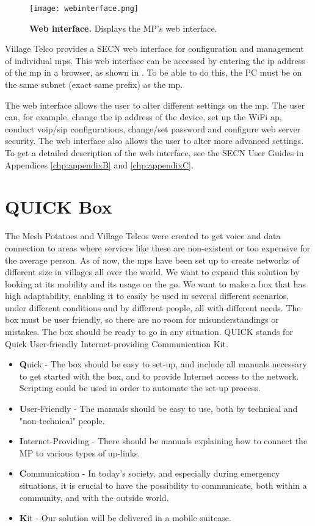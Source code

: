 \begin{figure}[t]
  \centering
      \texttt{[image: webinterface.png]}
  \caption [Web interface]{\textbf{Web interface.} Displays the MP's web interface.}
  \label{fig:webinterface}
\end{figure}

Village Telco provides a SECN web interface for configuration and management of individual \glspl{mp}. This web interface can be accessed by entering the \gls{ip} address of the \gls{mp} in a browser, as shown in . To be able to do this, the PC must be on the same subnet (exact same prefix) as the \gls{mp}.    

The web interface allows the user to alter different settings on the \gls{mp}. The user can, for example, change the \gls{ip} address of the device, set up the WiFi \gls{ap}, conduct \gls{voip}/\gls{sip} configurations, change/set password and configure web server security. The web interface also allows the user to alter more advanced settings. To get a detailed description of the web interface, see the SECN User Guides in Appendices \ref{chp:appendixB} and \ref{chp:appendixC}.



\section{QUICK Box}
The Mesh Potatoes and Village Telcos were created to get voice and data connection to areas where services like these are non-existent or too expensive for the average person. As of now, the \glspl{mp} have been set up to create networks of different size in villages all over the world. We want to expand this solution by looking at its mobility and its usage on the go. We want to make a box that has high adaptability, enabling it to easily be used in several different scenarios, under different conditions and by different people, all with different needs. The box must be user friendly, so there are no room for misunderstandings or mistakes. The box should be ready to go in any situation. QUICK stands for Quick User-friendly Internet-providing Communication Kit. 

\begin{itemize}
\item [] \textbf{Q}uick - The box should be easy to set-up, and include all manuals necessary to get started with the box, and to provide Internet access to the network. Scripting could be used in order to automate the set-up process. 
\item [] \textbf{U}ser-Friendly - The manuals should be easy to use, both by technical and "non-technical" people. 
\item [] \textbf{I}nternet-Providing - There should be manuals explaining how to connect the MP to various types of up-links. 
\item [] \textbf{C}ommunication - In today's society, and especially during emergency situations, it is crucial to have the possibility to communicate, both within a community, and with the outside world.
\item [] \textbf{K}it - Our solution will be delivered in a mobile suitcase. 
\end{itemize}

